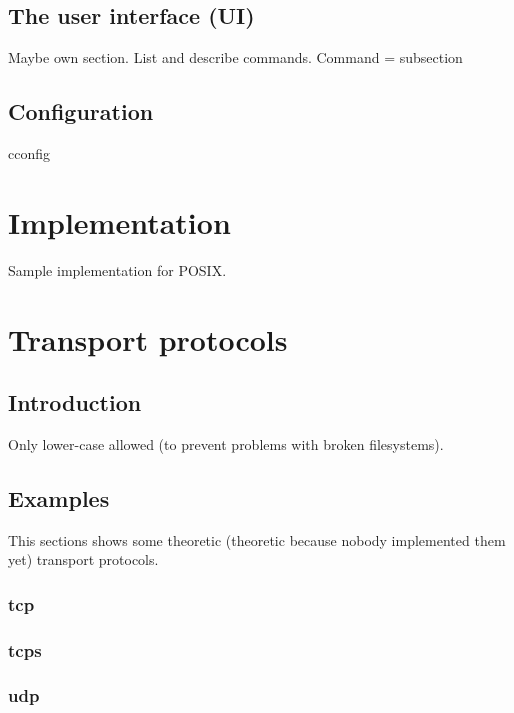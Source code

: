 \documentclass[12pt,a4paper]{book}
\begin{document}
\section{The user interface (UI)}
Maybe own section.
List and describe commands.
Command = subsection
\section{Configuration}
cconfig

\chapter{Implementation}
Sample implementation for POSIX.

\chapter{Transport protocols}
\section{Introduction}
Only lower-case allowed (to prevent problems with broken filesystems).
\section{Examples}
This sections shows some theoretic (theoretic because nobody implemented
them yet) transport protocols.
\subsection{tcp}
\subsection{tcps}
\subsection{udp}
\end{document}
